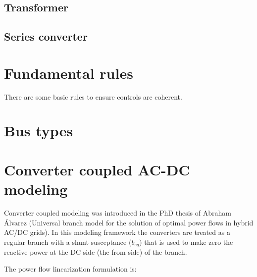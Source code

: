 \documentclass[11pt]{article}
\begin{document}
	\subsection{Transformer}


	\subsection{Series converter}


	\section{Fundamental rules}	
	There are some basic rules to ensure controls are coherent. 

	\section{Bus types}

	\section{Converter coupled AC-DC modeling}
	
	Converter coupled modeling was introduced in the PhD thesis of Abraham Álvarez (Universal branch model for the solution of optimal power flows in hybrid AC/DC grids). In this modeling framework the converters are treated as a regular branch with a shunt susceptance ($b_{eq}$) that is used to make zero the reactive power at the DC side (the from side) of the branch.
	

	
	
	The power flow linearization formulation is:
	
\end{document}
